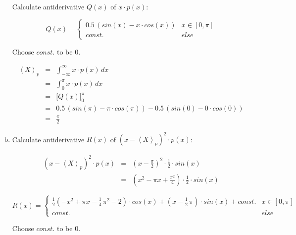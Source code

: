 \documentclass[11pt,a4paper]{article}
\begin{document}
\begin{enumerate}[a)]
Calculate antiderivative $Q(x)$ of $x \cdot p(x)$:

\begin{displaymath}
Q(x) = \begin{cases}
0.5 \, (sin(x) - x \cdot cos(x))    & x \in [0, \pi]\\
const.                              & else
\end{cases}
\end{displaymath}

Choose $const.$ to be $0$.

\begin{eqnarray*}
\left\langle X \right\rangle_p  &   = & \int_{-\infty}^\infty x \cdot p(x) \, dx\\
                                &   = & \int_0^\pi x \cdot p(x) \, dx\\
                                &   = & \Big[ Q(x) \Big]_0^\pi\\
                                &   = & 0.5 \, (sin(\pi) - \pi \cdot cos(\pi)) - 0.5 \, (sin(0) - 0 \cdot cos(0))\\
                                &   = & \frac{\pi}{2}
\end{eqnarray*}

\item


Calculate antiderivative $R(x)$ of $\left( x - \left\langle X \right\rangle_p \right)^2 \cdot p(x)$:

\begin{eqnarray*}
\left( x - \left\langle X \right\rangle_p \right)^2 \cdot p(x)
&   = & \left( x - \frac{\pi}{2} \right)^2 \cdot \frac{1}{2} \cdot sin(x)\\
&   = & \left( x^2 - \pi x + \frac{\pi^2}{4} \right) \cdot \frac{1}{2} \cdot sin(x)
\end{eqnarray*}

\begin{displaymath}
R(x) = \begin{cases}
\frac{1}{2} \left( -x^2 + \pi x - \frac{1}{4} \, \pi^2 - 2 \right)
\cdot cos(x) + \left( x - \frac{1}{2} \, \pi \right) \cdot sin(x) + const.      & x \in [0, \pi]\\
const.                                                                          & else
\end{cases}
\end{displaymath}

Choose $const.$ to be $0$.


\end{enumerate}
\end{document}
